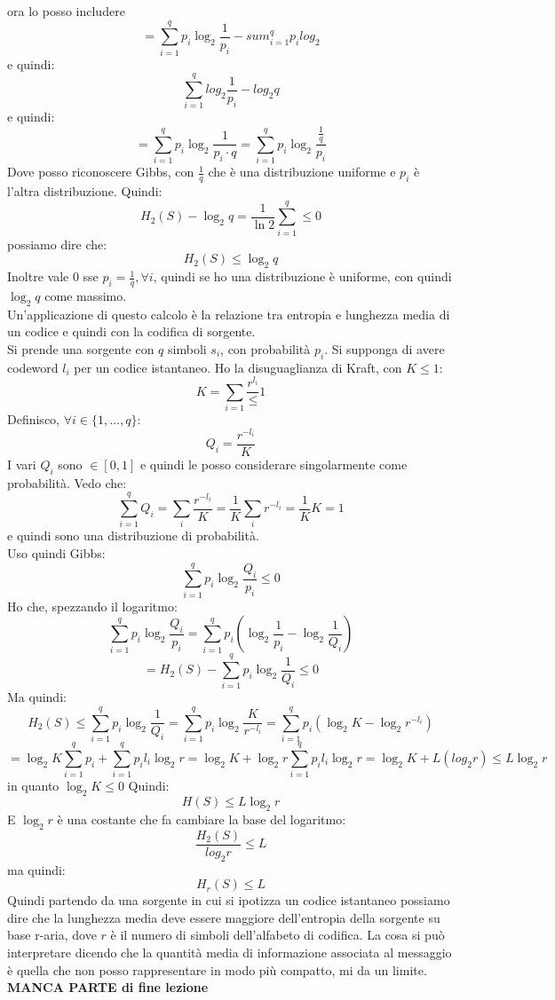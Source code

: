 \documentclass[a4paper,12pt, oneside]{book}
\begin{document}
ora lo posso includere
\[=\sum_{i=1}^q p_i\log_2\frac{1}{p_i}- sum_{i=1}^qp_i log_2\]
e quindi:
\[\sum_{i=1}^qlog_2\frac{1}{p_i}-log_2 q\]
e quindi:
\[=\sum_{i=1}^q p_i\log_2\frac{1}{p_i\cdot q}=\sum_{i=1}^q
  p_i\log_2\frac{\frac{1}{q}}{p_i}\]
Dove posso riconoscere Gibbs, con $\frac{1}{q}$ che è una distribuzione
uniforme e $p_i$ è l'altra distribuzione. Quindi:
\[H_2(S)-\log_2 q=\frac{1}{\ln 2}\sum_{i=1}^q\leq 0\]
possiamo dire che:
\[H_2(S)\leq \log_2 q\]
Inoltre vale 0 sse $p_i=\frac{1}{q},\forall i$, quindi se ho una distribuzione è
uniforme, con quindi $\log_2 q$ come massimo.\\
Un'applicazione di questo calcolo è la relazione tra entropia e lunghezza media
di un codice e quindi con la codifica di sorgente.\\
Si prende una sorgente con $q$ simboli $s_i$, con probabilità $p_i$. Si supponga
di avere codeword $l_i$ per un codice istantaneo. Ho la disuguaglianza di Kraft,
con $K\leq 1$:
\[K=\sum_{i=1}\frac{r^{l_i}}\leq 1\]
Definisco, $\forall i\in\{1,\ldots, q\}$:
\[Q_i=\frac{r^{-l_i}}{K}\]
I vari $Q_i$ sono $\in[0,1]$ e quindi le posso considerare singolarmente come
probabilità. Vedo che:
\[\sum_{i=1}^q Q_i=\sum_i \frac{r^{-l_i}}{K} = \frac{1}{K}\sum_i
  r^{-l_i}=\frac{1}{K}K =1\]
e quindi sono una distribuzione di probabilità.\\
Uso quindi Gibbs:
\[\sum_{i=1}^q p_i\log_2\frac{Q_i}{p_i}\leq 0\]
Ho che, spezzando il logaritmo:
\[\sum_{i=1}^q p_i\log_2\frac{Q_i}{p_i}=\sum_{i=1}^qp_i\left(
  \log_2\frac{1}{p_i}-\log_2\frac{1}{Q_i}\right)\]
\[=H_2(S)-\sum_{i=1}^qp_i\log_2\frac{1}{Q_i}\leq 0\]
Ma quindi:
\[H_2(S)\leq  \sum_{i=1}^qp_i\log_2\frac{1}{Q_i}=\sum_{i=1}^qp_i\log_2
  \frac{K}{r^{-l_i}}=\sum_{i=1}^qp_i\left(\log_2K - \log_2 r^{-l_i}\right)\]
\[=\log_2 K\sum_{i=1}^qp_i+\sum_{i=1}^qp_i l_i\log_2 r=
  \log_2 K+\log_2 r\sum_{i=1}^qp_i l_i\log_2 r=\log_2 K+L(log_2 r)\leq L\log_2
  r\]
in quanto $\log_2 K\leq 0$
Quindi:
\[H(S)\leq L\log_2 r\]
E $\log_2 r$ è una costante che fa cambiare la base del logaritmo:
\[\frac{H_2(S)}{log_2 r}\leq L\]
ma quindi:
\[H_r(S)\leq L\]
Quindi partendo da una sorgente in cui si ipotizza un codice istantaneo possiamo
dire che la lunghezza media deve essere maggiore dell'entropia della sorgente su
base r-aria, dove $r$ è il numero di simboli dell'alfabeto di codifica. La cosa
si può interpretare dicendo che la quantità media di informazione associata al
messaggio è quella che non posso rappresentare in modo più compatto, mi da un
limite.\\
\textbf{MANCA PARTE di fine lezione}\\
\end{document}
